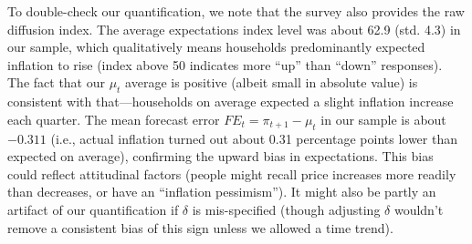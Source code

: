\documentclass[12pt]{article}
\begin{document}
To double-check our quantification, we note that the survey also provides the raw diffusion index. The average expectations index level was about 62.9 (std. 4.3) in our sample, which qualitatively means households predominantly expected inflation to rise (index above 50 indicates more “up” than “down” responses). The fact that our $\mu_t$ average is positive (albeit small in absolute value) is consistent with that—households on average expected a slight inflation increase each quarter. The mean forecast error $FE_t = \pi_{t+1}-\mu_t$ in our sample is about $-0.311$ (i.e., actual inflation turned out about 0.31 percentage points lower than expected on average), confirming the upward bias in expectations. This bias could reflect attitudinal factors (people might recall price increases more readily than decreases, or have an “inflation pessimism”). It might also be partly an artifact of our quantification if $\delta$ is mis-specified (though adjusting $\delta$ wouldn't remove a consistent bias of this sign unless we allowed a time trend).
\end{document}
